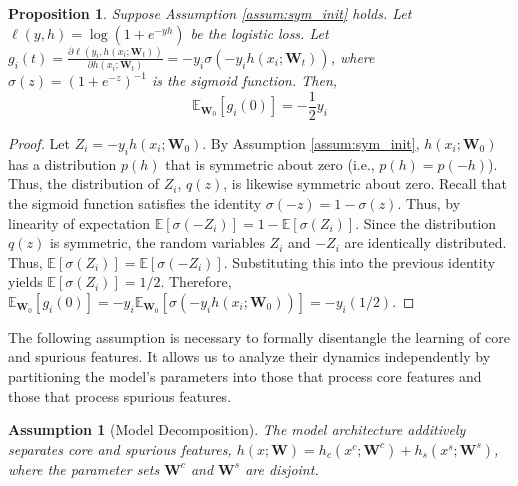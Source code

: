 \documentclass[letter,11pt]{article}
\newtheorem{proposition}{Proposition}
\newtheorem{assumption}{Assumption}
\begin{document}
\begin{proposition}\label{prop:init_grad}
    Suppose Assumption \ref{assum:sym_init} holds. Let $\ell(y, h) = \log(1 + e^{-y h})$ be the logistic loss. Let $g_i(t) = \frac{\partial \ell(y_i, h(x_i; \mathbf{W}_t))}{\partial h(x_i; \mathbf{W}_t)} = -y_i \sigma(-y_i h(x_i; \mathbf{W}_t))$, where $\sigma(z) = (1 + e^{-z})^{-1}$ is the sigmoid function. Then,
\begin{equation}
    \mathbb{E}_{\mathbf{W}_0}[g_i(0)] = -\frac{1}{2} y_i
\end{equation}
\end{proposition}
\begin{proof}
    Let $Z_i = -y_i h(x_i; \mathbf{W}_0)$. By Assumption \ref{assum:sym_init}, $h(x_i; \mathbf{W}_0)$ has a distribution $p(h)$ that is symmetric about zero (i.e., $p(h) = p(-h)$). Thus, the distribution of $Z_i$, $q(z)$, is likewise symmetric about zero. 
Recall that the sigmoid function satisfies the identity $\sigma(-z) = 1 - \sigma(z)$. Thus, by linearity of expectation $\mathbb{E}[\sigma(-Z_i)] = 1 - \mathbb{E}[\sigma(Z_i)]$.
Since the distribution $q(z)$ is symmetric, the random variables $Z_i$ and $-Z_i$ are identically distributed. Thus, $\mathbb{E}[\sigma(Z_i)] = \mathbb{E}[\sigma(-Z_i)]$.
Substituting this into the previous identity yields $\mathbb{E}[\sigma(Z_i)] = 1/2$.
Therefore, 
$\mathbb{E}_{\mathbf{W}_0}[g_i(0)] = -y_i \mathbb{E}_{\mathbf{W}_0}[\sigma(-y_i h(x_i; \mathbf{W}_0))] = -y_i (1/2)$.
\end{proof}

The following assumption is necessary to formally disentangle the learning of core and spurious features. It allows us to analyze their dynamics independently by partitioning the model's parameters into those that process core features and those that process spurious features.
\begin{assumption}[Model Decomposition]\label{assum:decomp}
    The model architecture additively separates core and spurious features, $h(x; \mathbf{W}) = h_c(x^c; \mathbf{W}^c) + h_s(x^s; \mathbf{W}^s)$, where the parameter sets $\mathbf{W}^c$ and $\mathbf{W}^s$ are disjoint. 
\end{assumption}
\end{document}
